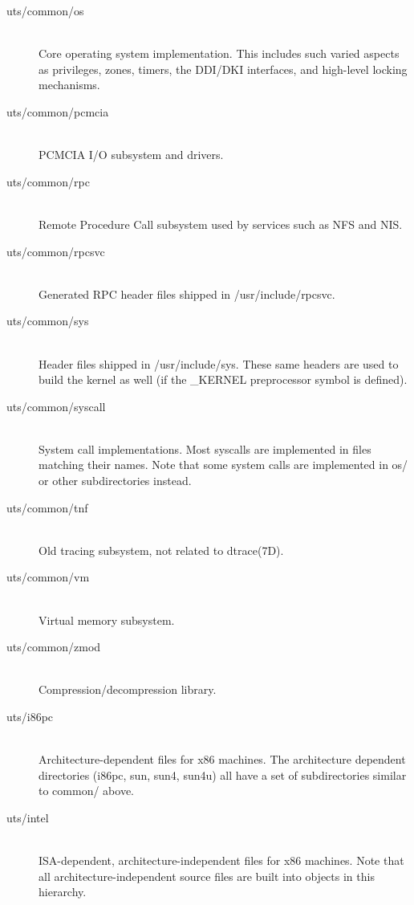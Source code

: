 \documentclass{article}
\begin{document}
\begin{description}
\item[uts/common/os] \hfill \\
  Core operating system implementation. This includes such varied aspects as
  privileges, zones, timers, the DDI/DKI interfaces, and high-level locking
  mechanisms.

\item[uts/common/pcmcia] \hfill \\
  PCMCIA I/O subsystem and drivers.

\item[uts/common/rpc] \hfill \\
  Remote Procedure Call subsystem used by services such as NFS and NIS.

\item[uts/common/rpcsvc] \hfill \\
  Generated RPC header files shipped in /usr/include/rpcsvc.

\item[uts/common/sys] \hfill \\
  Header files shipped in /usr/include/sys. These same headers are used to build
  the kernel as well (if the \_KERNEL preprocessor symbol is defined).

\item[uts/common/syscall] \hfill \\
  System call implementations. Most syscalls are implemented in files mat\-ch\-ing
  their names. Note that some system calls are implemented in os/ or other
  subdirectories instead.

\item[uts/common/tnf] \hfill \\
  Old tracing subsystem, not related to dtrace(7D).

\item[uts/common/vm] \hfill \\
  Virtual memory subsystem.

\item[uts/common/zmod] \hfill \\
  Compression/decompression library.

\item[uts/i86pc] \hfill \\
  Architecture-dependent files for x86 machines. The architecture dependent
  directories (i86pc, sun, sun4, sun4u) all have a set of subdirectories similar
  to common/ above.

\item[uts/intel] \hfill \\
  ISA-dependent, architecture-independent files for x86 machines. Note that all
  architecture-independent source files are built into objects in this hierarchy.


\end{description}
\end{document}
